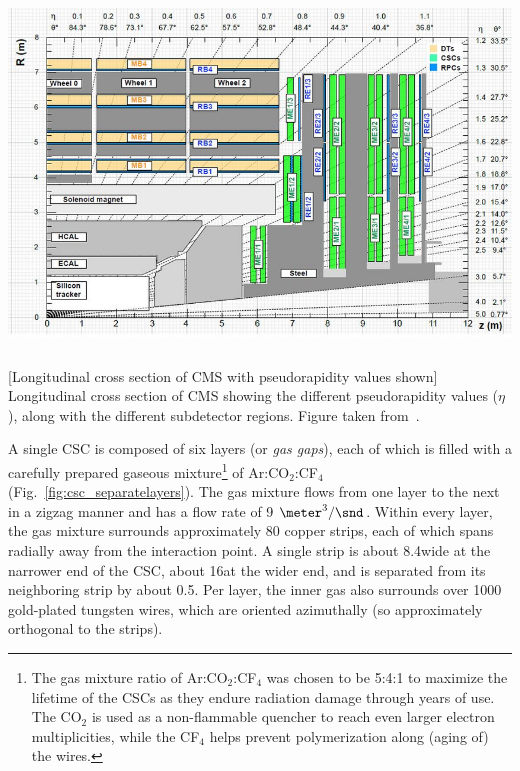 \begin{multiFigure}
    \centering
    \includegraphics[width=15cm,height=10cm,keepaspectratio]{figures/cms/cms_longitudinal_view.png}
        [Longitudinal cross section of CMS with pseudorapidity values shown]
        {Longitudinal cross section of CMS showing the different pseudorapidity values ($\eta$), along with the different subdetector regions.
        Figure taken from~\cite{PhysRevLett.114.191803}. %
        }
    \label{fig:cms_long_view_subdetectors}
\end{multiFigure}
A single CSC is composed of six layers (or \emph{gas gaps}), each of which is filled with a carefully prepared gaseous mixture\footnote{
    The gas mixture ratio of Ar:CO$_{2}$:CF$_{4}$ was chosen to be 5:4:1 to maximize the lifetime of the CSCs as they endure radiation damage through years of use.
    The CO$_{2}$ is used as a non-flammable quencher to reach even larger electron multiplicities, while the CF$_{4}$ helps prevent polymerization along (aging of) the wires.
    }
of Ar:CO$_{2}$:CF$_{4}$ (Fig.~\ref{fig:csc_separatelayers}).
The gas mixture flows from one layer to the next in a zigzag manner and has a flow rate of 9 $\meter^3/\snd$. %
Within every layer, the gas mixture surrounds approximately 80 copper strips, each of which spans radially away from the interaction point.
A single strip is about 8.4\mm wide at the narrower end of the CSC, about 16\mm at the wider end, and is separated from its neighboring strip by about 0.5\mm.
Per layer, the inner gas also surrounds over 1000 gold-plated tungsten wires, which are oriented azimuthally (so approximately orthogonal to the strips).
